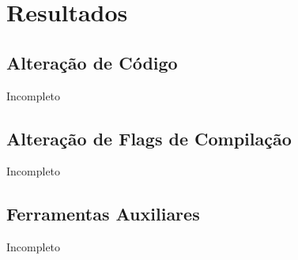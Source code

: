\chapter[Resultados]{Resultados}

\section{Alteração de Código}
    Incompleto
\section{Alteração de Flags de Compilação}
    Incompleto
\section{Ferramentas Auxiliares}
    Incompleto
